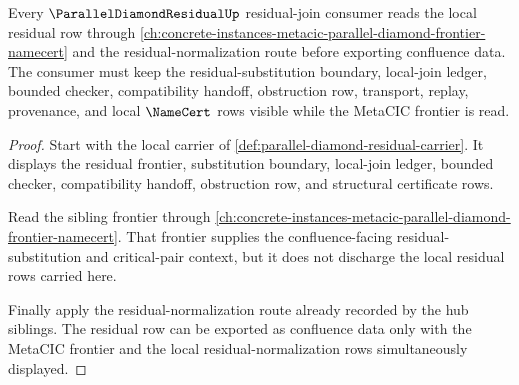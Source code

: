 \begin{proposition}
\label{thm:parallel-diamond-residual-sibling-route}
Every $\ParallelDiamondResidualUp$ residual-join consumer reads the local residual row through \autoref{ch:concrete-instances-metacic-parallel-diamond-frontier-namecert} and the residual-normalization route before exporting confluence data. The consumer must keep the residual-substitution boundary, local-join ledger, bounded checker, compatibility handoff, obstruction row, transport, replay, provenance, and local $\NameCert$ rows visible while the MetaCIC frontier is read.
\end{proposition}
\begin{proof}
Start with the local carrier of \autoref{def:parallel-diamond-residual-carrier}. It displays the residual frontier, substitution boundary, local-join ledger, bounded checker, compatibility handoff, obstruction row, and structural certificate rows.

Read the sibling frontier through \autoref{ch:concrete-instances-metacic-parallel-diamond-frontier-namecert}. That frontier supplies the confluence-facing residual-substitution and critical-pair context, but it does not discharge the local residual rows carried here.

Finally apply the residual-normalization route already recorded by the hub siblings. The residual row can be exported as confluence data only with the MetaCIC frontier and the local residual-normalization rows simultaneously displayed.
\end{proof}
